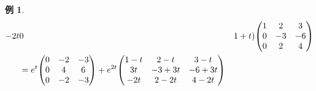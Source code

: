 \documentclass[autodetect-engine,dvipdfmx-if-dvi,ja=standard]{bxjsarticle}
\theoremstyle{mystyle1}
\theoremstyle{mystyle2}
\newtheorem{example}{例}
\begin{document}
\begin{example}
\begin{align*}
    -2t & 0                                                                                  & 1+t
    )\mqty(
    1   & 2                                                                                  & 3     \\
    0   & -3                                                                                 & -6    \\
    0   & 2                                                                                  & 4
    )                                                                                                \\
        & =e^t\mqty(
    0   & -2                                                                                 & -3    \\
    0   & 4                                                                                  & 6     \\
    0   & -2                                                                                 & -3
    )+e^{2t}\mqty(
    1-t & 2-t                                                                                & 3-t   \\
    3t  & -3+3t                                                                              & -6+3t \\
    -2t & 2-2t                                                                               & 4-2t
    )
  \end{align*}
\end{example}
\end{document}
